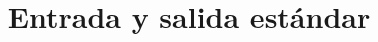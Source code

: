 \documentclass{doc}
\title{Entrada y salida estándar}
\begin{document}
\makedocheader



\end{document}
